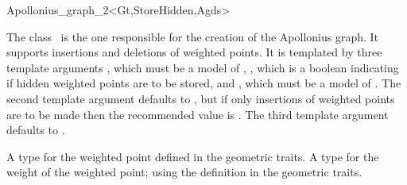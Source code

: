

\begin{ccRefClass}{Apollonius_graph_2<Gt,StoreHidden,Agds>}

\ccDefinition

The class \ccRefName\ is the one responsible for the creation of the
Apollonius graph. It supports insertions and deletions of weighted
points. It is templated by three template arguments , which
must be a model of , ,
which is a boolean indicating if hidden weighted points are to be
stored, and , which must be a model of
. The second template argument
defaults to , but if only insertions of weighted points are
to be made then the recommended value is . The third template
argument defaults to .


\ccTypes

%
\ccGlue
{}
\ccGlue
{}
\ccGlue
{}
{A type for the weighted point defined in the geometric traits.}
\ccGlue
{}
{A type for the weight of the weighted point; using the definition in
the geometric traits.}
%



\end{ccRefClass}
